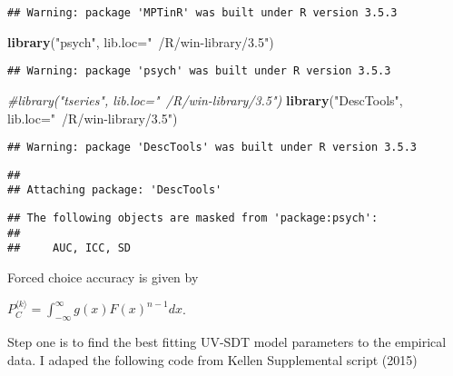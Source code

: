 \documentclass[]{article}
\newenvironment{Shaded}{\begin{snugshade}}{\end{snugshade}}
\newcommand{\KeywordTok}[1]{\textcolor[rgb]{0.13,0.29,0.53}{\textbf{#1}}}
\newcommand{\DataTypeTok}[1]{\textcolor[rgb]{0.13,0.29,0.53}{#1}}
\newcommand{\StringTok}[1]{\textcolor[rgb]{0.31,0.60,0.02}{#1}}
\newcommand{\CommentTok}[1]{\textcolor[rgb]{0.56,0.35,0.01}{\textit{#1}}}
\newcommand{\NormalTok}[1]{#1}
\begin{document}
\begin{verbatim}
## Warning: package 'MPTinR' was built under R version 3.5.3
\end{verbatim}

\begin{Shaded}
\begin{Highlighting}[]
\KeywordTok{library}\NormalTok{(}\StringTok{"psych"}\NormalTok{, }\DataTypeTok{lib.loc=}\StringTok{"~/R/win-library/3.5"}\NormalTok{)}
\end{Highlighting}
\end{Shaded}

\begin{verbatim}
## Warning: package 'psych' was built under R version 3.5.3
\end{verbatim}

\begin{Shaded}
\begin{Highlighting}[]
\CommentTok{#library("tseries", lib.loc="~/R/win-library/3.5")}
\KeywordTok{library}\NormalTok{(}\StringTok{"DescTools"}\NormalTok{, }\DataTypeTok{lib.loc=}\StringTok{"~/R/win-library/3.5"}\NormalTok{)}
\end{Highlighting}
\end{Shaded}

\begin{verbatim}
## Warning: package 'DescTools' was built under R version 3.5.3
\end{verbatim}

\begin{verbatim}
## 
## Attaching package: 'DescTools'
\end{verbatim}

\begin{verbatim}
## The following objects are masked from 'package:psych':
## 
##     AUC, ICC, SD
\end{verbatim}

Forced choice accuracy is given by

\(P_C^{\langle k \rangle} = \int_{-\infty}^{\infty} g(x)F(x)^{n-1}dx\).

Step one is to find the best fitting UV-SDT model parameters to the
empirical data. I adaped the following code from Kellen Supplemental
script (2015)
\end{document}
